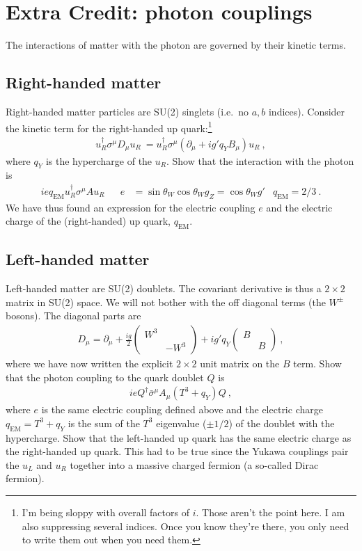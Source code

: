 \documentclass[12pt]{article}
\numberwithin{equation}{section}    %
\begin{document}
\section*{Extra Credit: photon couplings}

The interactions of matter with the photon are governed by their kinetic terms.

\subsection*{Right-handed matter}

Right-handed matter particles are SU(2) singlets (i.e.\ no $a,b$ indices). Consider the kinetic term for the right-handed up quark:\footnote{I'm being sloppy with overall factors of $i$. Those aren't the point here. I am also suppressing several indices. Once you know they're there, you only need to write them out when you need them.}
\begin{align}
	u_R^\dag \sigma^\mu D_\mu u_R \ 
	= 
	u_R^\dag \sigma^\mu  \left(\partial_\mu + ig' q_Y B_\mu\right) u_R \ ,
\end{align}
where $q_Y$ is the hypercharge of the $u_R$. Show that the interaction with the photon is
\begin{align}
	i e q_\text{EM} u_R^\dag \sigma^\mu A u_R
	&&
	e&= \sin\theta_W \cos\theta_W g_Z = \cos\theta_W g'
	&
	q_\text{EM} = 2/3 \ .
\end{align}
We have thus found an expression for the electric coupling $e$ and the electric charge of the (right-handed) up quark, $q_\text{EM}$.



\subsection*{Left-handed matter}

Left-handed matter are SU(2) doublets. The covariant derivative is thus a $2\times 2$ matrix in SU(2) space. We will not bother with the off diagonal terms (the $W^\pm$ bosons). The diagonal parts are
\begin{align}
	D_\mu = \partial_\mu + \frac{ig}{2}
	\begin{pmatrix}
		W^3 & \\
		& -W^3
	\end{pmatrix}
	+ 
	i g' q_Y 
	\begin{pmatrix}
		B & \\
		& B
	\end{pmatrix} \ ,
\end{align}
where we have now written the explicit $2\times 2$ unit matrix on the $B$ term. Show that the photon coupling to the quark doublet $Q$ is
\begin{align}
	i e Q^\dag \bar\sigma^\mu  A_\mu (T^3 + q_Y) Q \ ,
\end{align}
where $e$ is the same electric coupling defined above and the electric charge $q_\text{EM}=T^3 + q_Y$ is the sum of the $T^3$ eigenvalue ($\pm 1/2$) of the doublet with the hypercharge. Show that the left-handed up quark has the same electric charge as the right-handed up quark. This had to be true since the Yukawa couplings pair the $u_L$ and $u_R$ together into a massive charged fermion (a so-called Dirac fermion).
\end{document}
